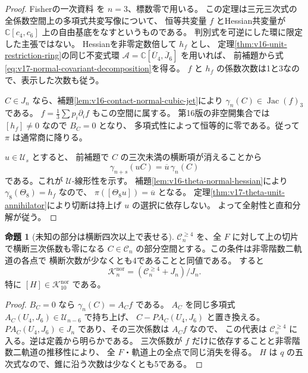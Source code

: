 \documentclass[a4paper,11pt]{ltjsarticle}
\theoremstyle{definition}
\newtheorem{proposition}[theorem]{命題}
\begin{document}
\begin{proof}
Fisherの一次資料\cite[Definition~2.5, Lemma~2.6, Theorem~2.7(i)]{FisherHessian2012}
を $n=3$、標数零で用いる。
この定理は三元三次式の全係数空間上の多項式共変写像について、
恒等共変量 $f$ とHessian共変量が
$\mathbb C[c_4,c_6]$ 上の自由基底をなすというものである。
判別式を可逆にした環に限定した主張ではない。
Hessianを非零定数倍して $h_f$ とし、
定理\ref{thm:v16-unit-restriction-ring}の同じ不変式環
$\mathcal A=\mathbb C[\overline U_4,\overline J_6]$ を用いれば、
前補題から式\eqref{eq:v17-normal-covariant-decomposition}を得る。
$f$ と $h_f$ の係数次数は1と3なので、表示した次数も従う。

$C\in J_n$ なら、補題\ref{lem:v16-contact-normal-cubic-jet}により
$\gamma_n(C)\in\operatorname{Jac}(f)_3$ である。
$f=\frac13\sum p_i\partial_i f$ もこの空間に属する。
第16版の非空開集合では $[h_f]\ne0$ なので $B_C=0$ となり、
多項式性によって恒等的に零である。従って $\pi$ は通常商に降りる。

$u\in\mathcal U_s$ とすると、
前補題で $C$ の三次未満の横断項が消えることから
\[
 \gamma_{n+s}(uC)=\overline u\,\gamma_n(C)
\]
である。これが $\mathcal U$-線形性を示す。
補題\ref{lem:v16-theta-normal-hessian}により $\gamma_8(\Theta_8)=h_f$ なので、
$\pi([\Theta_8u])=\overline u$ となる。
定理\ref{thm:v17-theta-unit-annihilator}により切断は持上げ $u$ の選択に依存しない。
よって全射性と直和分解が従う。
\end{proof}

\begin{proposition}[未知の部分は横断四次以上で表せる]
\label{prop:v17-normal-invisible-representatives}
$\mathcal C_n^{\ge4}$ を、全 $F$ に対して上の切片で横断三次係数も零になる
$C\in\mathcal C_n$ の部分空間とする。この条件は非零階数二軌道の各点で
横断次数が少なくとも4であることと同値である。
すると
\begin{equation}\label{eq:v17-normal-invisible-representatives}
 \mathcal K_n^{\mathrm{nor}}
 =(\mathcal C_n^{\ge4}+J_n)/J_n.
\end{equation}
特に $[H]\in\mathcal K_{10}^{\mathrm{nor}}$ である。
\end{proposition}

\begin{proof}
$B_C=0$ なら $\gamma_n(C)=A_C f$ である。
$A_C$ を同じ多項式 $A_C(U_4,J_6)\in\mathcal U_{n-6}$ で持ち上げ、
$C-PA_C(U_4,J_6)$ と置き換える。
$PA_C(U_4,J_6)\in J_n$ であり、その三次係数は $A_Cf$ なので、
この代表は $\mathcal C_n^{\ge4}$ に入る。逆は定義から明らかである。
三次係数が $f$ だけに依存することと非零階数二軌道の推移性により、
全 $F$・軌道上の全点で同じ消失を得る。
$H$ は $q$ の五次式なので、錐に沿う次数は少なくとも5である。
\end{proof}
\end{document}
